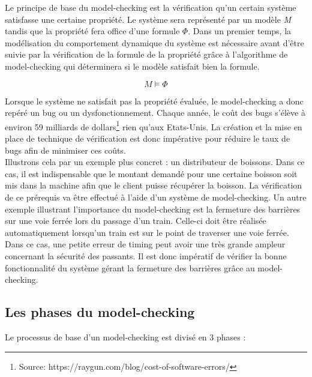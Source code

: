 \documentclass[runningheads,a4paper,10pt]{llncs}
\begin{document}
\noindent
Le principe de base du model-checking est la vérification qu'un certain système satisfasse une certaine propriété. Le système sera représenté par un modèle \textit{M} tandis que la propriété fera office d'une formule $\Phi$. Dans un premier temps, la modélisation du comportement dynamique du système est nécessaire avant d'être suivie par la vérification de la formule de la propriété grâce à l'algorithme de model-checking qui déterminera si le modèle satisfait bien la formule.  

$$\boxed{\textit{M} \vDash \Phi}$$

\noindent
Lorsque le système ne satisfait pas la propriété évaluée, le model-checking a donc repéré un bug ou un dysfonctionnement. Chaque année, le coût des bugs s'élève à environ 59 milliards de dollars\footnote{Source: https://raygun.com/blog/cost-of-software-errors/} rien qu'aux Etats-Unis. La création et la mise en place de technique de vérification est donc impérative pour réduire le taux de bugs afin de minimiser ces coûts.  \\

\noindent
Illustrons cela par un exemple plus concret : un distributeur de boissons. Dans ce cas, il est indispensable que le montant demandé pour une certaine boisson soit mis dans la machine afin que le client puisse récupérer la boisson. La vérification de ce prérequis va être effectué à l'aide d'un système de model-checking. 
Un autre exemple illustrant l'importance du model-checking est la fermeture des barrières sur une voie ferrée lors du passage d'un train. 
Celle-ci doit être réalisée automatiquement lorsqu'un train est sur le point de traverser une voie ferrée. Dans ce cas, une petite erreur de timing peut avoir une très grande ampleur concernant la sécurité des passants. Il est donc impératif de vérifier la bonne fonctionnalité du système gérant la fermeture des barrières grâce au model-checking. 

\noindent 

\subsection{Les phases du model-checking}

Le processus de base d'un model-checking est divisé en 3 phases : 
\end{document}
